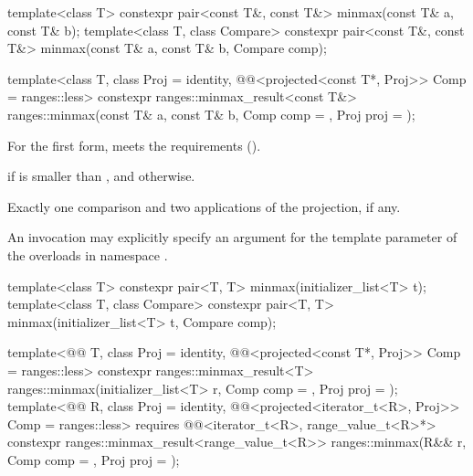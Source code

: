 %
\begin{itemdecl}
template<class T>
  constexpr pair<const T&, const T&> minmax(const T& a, const T& b);
template<class T, class Compare>
  constexpr pair<const T&, const T&> minmax(const T& a, const T& b, Compare comp);

template<class T, class Proj = identity,
         @@<projected<const T*, Proj>> Comp = ranges::less>
  constexpr ranges::minmax_result<const T&>
    ranges::minmax(const T& a, const T& b, Comp comp = {}, Proj proj = {});
\end{itemdecl}


\begin{itemdescr}
\pnum
\expects
For the first form,  meets the
 requirements ().

\pnum
\returns
{} if  is smaller than , and
 otherwise.

\pnum
\complexity
Exactly one comparison and two applications of the projection, if any.

\pnum
\remarks
An invocation may explicitly specify
an argument for the template parameter 
of the overloads in namespace .
\end{itemdescr}

%
\begin{itemdecl}
template<class T>
  constexpr pair<T, T> minmax(initializer_list<T> t);
template<class T, class Compare>
  constexpr pair<T, T> minmax(initializer_list<T> t, Compare comp);

template<@@ T, class Proj = identity,
         @@<projected<const T*, Proj>> Comp = ranges::less>
  constexpr ranges::minmax_result<T>
    ranges::minmax(initializer_list<T> r, Comp comp = {}, Proj proj = {});
template<@@ R, class Proj = identity,
         @@<projected<iterator_t<R>, Proj>> Comp = ranges::less>
  requires @@<iterator_t<R>, range_value_t<R>*>
  constexpr ranges::minmax_result<range_value_t<R>>
    ranges::minmax(R&& r, Comp comp = {}, Proj proj = {});
\end{itemdecl}

